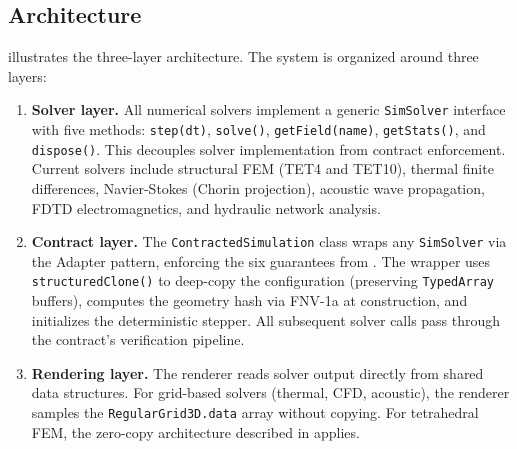\documentclass[journal]{IEEEtran}
\begin{document}
\subsection{Architecture}

 illustrates the three-layer architecture.
The system is organized around three layers:

\begin{enumerate}
  \item \textbf{Solver layer.} All numerical solvers implement a generic
    \texttt{SimSolver} interface with five methods: \texttt{step(dt)},
    \texttt{solve()}, \texttt{getField(name)}, \texttt{getStats()}, and
    \texttt{dispose()}. This decouples solver implementation from contract
    enforcement. Current solvers include structural FEM (TET4 and TET10),
    thermal finite differences, Navier-Stokes (Chorin projection), acoustic
    wave propagation, FDTD electromagnetics, and hydraulic network analysis.
  \item \textbf{Contract layer.} The \texttt{ContractedSimulation} class
    wraps any \texttt{SimSolver} via the Adapter pattern, enforcing the six
    guarantees from . The wrapper uses
    \texttt{structuredClone()} to deep-copy the configuration (preserving
    \texttt{TypedArray} buffers), computes the geometry hash via FNV-1a at
    construction, and initializes the deterministic stepper. All subsequent
    solver calls pass through the contract's verification pipeline.
  \item \textbf{Rendering layer.} The renderer reads solver output directly
    from shared data structures. For grid-based solvers (thermal, CFD,
    acoustic), the renderer samples the \texttt{RegularGrid3D.data} array
    without copying. For tetrahedral FEM, the zero-copy architecture
    described in  applies.
\end{enumerate}
\end{document}
